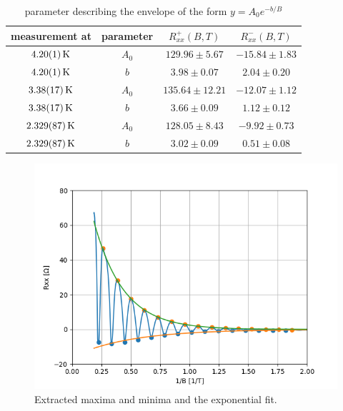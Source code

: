 \documentclass[12pt,a4paper]{article}
\begin{document}
\begin{table}
\centering
\begin{tabular}{|c|c|c|c|}
\hline 
measurement at & parameter & $ R_{xx}^{+}(B,T)$ & $ R_{xx}^{-}(B,T)$ \\ 
\hline 
$\SI{4.2 \pm 0.01}{K}$ & $A_0$ & $129.96\pm 5.67$ & $-15.84\pm 1.83$ \\ 
\hline
$\SI{4.2 \pm 0.01}{K}$ & $b$ & $3.98\pm 0.07$ & $2.04\pm 0.20$ \\ 
\hline
\hline 
$\SI{3.38 \pm 0.17}{K}$ & $A_0$ & $135.64\pm 12.21$ & $-12.07\pm 1.12$ \\ 
\hline 
$\SI{3.38 \pm 0.17}{K}$ & $b$ & $3.66\pm 0.09$ & $1.12\pm 0.12$ \\ 
\hline 
\hline 
$\SI{2.329 \pm 0.087}{K}$ & $A_0$ & $128.05\pm 8.43$ & $-9.92\pm 0.73$ \\ 
\hline 
$\SI{2.329 \pm 0.087}{K}$ & $b$ & $3.02\pm 0.09$ & $0.51\pm 0.08$ \\ 
\hline 
\end{tabular} 
\caption{parameter describing the envelope of the form $y = A_0 e^{-b/B}$}
\label{tab:exp}
\end{table}

\begin{figure}
\centering
\includegraphics[scale=0.8]{Bilder/peaks.png}
\caption{Extracted maxima and minima and the exponential fit.}
\label{fig:m_fit}
\end{figure}
\end{document}
